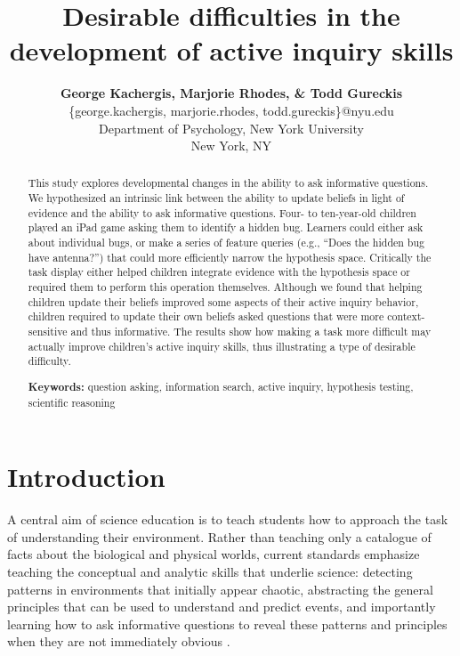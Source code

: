 \documentclass[10pt,letterpaper]{article}
\title{Desirable difficulties in the development of active inquiry skills}
\author{
  {\large \bf George Kachergis, Marjorie Rhodes, \& Todd Gureckis} \\
  \{george.kachergis, marjorie.rhodes, todd.gureckis\}@nyu.edu \\
  Department of Psychology, New York University \\
  New York, NY
}
\begin{document}
\maketitle

\begin{abstract}
This study explores developmental changes in the ability to ask 
informative questions.  We hypothesized an intrinsic link between the ability to 
update beliefs in light of evidence and the ability to ask informative questions. 
Four- to ten-year-old children 
played an iPad game asking them to identify a hidden bug. Learners could either 
ask about individual bugs, or make a series of feature queries (e.g., ``Does the 
hidden bug have antenna?'') that could more efficiently narrow the hypothesis 
space. Critically the task display either helped children integrate evidence 
with the hypothesis space or required them to perform this operation themselves.  Although we 
found that helping children update their beliefs improved some aspects of their active 
inquiry behavior, children required to update their own beliefs asked questions that 
were more context-sensitive and thus informative.  The results show how making a 
task more difficult may actually improve children's active inquiry skills, thus illustrating a type of 
desirable difficulty.

\textbf{Keywords:} 
question asking, information search, active inquiry, hypothesis testing, scientific 
reasoning
\end{abstract}


\section{Introduction} 


A central aim of science education is to teach students how to approach the task of 
understanding their environment. Rather than teaching only a catalogue of facts 
about the biological and physical worlds, current standards emphasize teaching the 
conceptual and analytic skills that underlie science: detecting patterns in 
environments that initially appear chaotic, abstracting the general principles that can 
be used to understand and predict events, and importantly learning how to ask 
informative questions to reveal these patterns and principles when they are not 
immediately obvious \cite{Bransford:2000,Donovan:2005,Duschl:2007}. 
\end{document}

